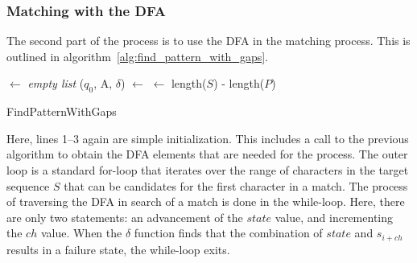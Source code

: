 \subsubsection{Matching with the DFA}

The second part of the process is to use the DFA in the matching process. This is outlined in algorithm~\ref{alg:find_pattern_with_gaps}.

\IncMargin{1em}
\begin{algorithm}[ht]
  \DontPrintSemicolon

  \BlankLine
  \Matches $\leftarrow$ \textit{empty list}\;
  ($q_0$, A, $\delta$) $\leftarrow$ \;
  \End $\leftarrow$ length($S$) - length($P$)\;
  \KwRet{\Matches}\;
\caption{FindPatternWithGaps}
\label{alg:find_pattern_with_gaps}
\end{algorithm}
\DecMargin{1em}

Here, lines 1--3 again are simple initialization. This includes a call to the previous algorithm to obtain the DFA elements that are needed for the process. The outer loop is a standard for-loop that iterates over the range of characters in the target sequence $S$ that can be candidates for the first character in a match. The process of traversing the DFA in search of a match is done in the while-loop. Here, there are only two statements: an advancement of the $state$ value, and incrementing the $ch$ value. When the $\delta$ function finds that the combination of $state$ and $s_{i+ch}$ results in a failure state, the while-loop exits.

